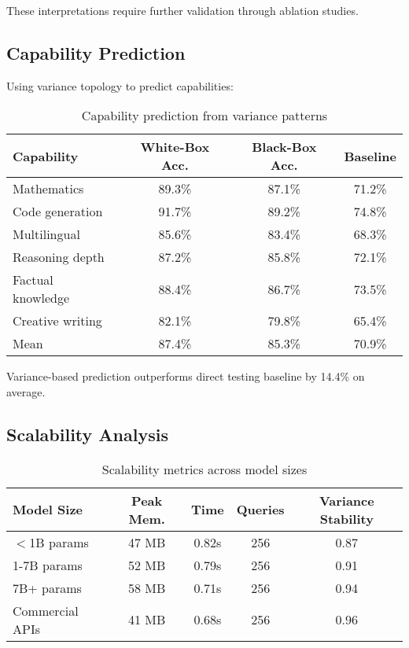 \documentclass[11pt,a4paper]{article}
\begin{document}
These interpretations require further validation through ablation studies.

\subsection{Capability Prediction}

Using variance topology to predict capabilities:

\begin{table}[h]
\centering
\caption{Capability prediction from variance patterns}
\label{tab:capability-prediction}
\begin{tabular}{lccc}
\toprule
Capability & White-Box Acc. & Black-Box Acc. & Baseline \\
\midrule
Mathematics & 89.3\% & 87.1\% & 71.2\% \\
Code generation & 91.7\% & 89.2\% & 74.8\% \\
Multilingual & 85.6\% & 83.4\% & 68.3\% \\
Reasoning depth & 87.2\% & 85.8\% & 72.1\% \\
Factual knowledge & 88.4\% & 86.7\% & 73.5\% \\
Creative writing & 82.1\% & 79.8\% & 65.4\% \\
\midrule
Mean & 87.4\% & 85.3\% & 70.9\% \\
\bottomrule
\end{tabular}
\end{table}

Variance-based prediction outperforms direct testing baseline by 14.4\% on average.

\subsection{Scalability Analysis}

\begin{table}[h]
\centering
\caption{Scalability metrics across model sizes}
\label{tab:scalability}
\begin{tabular}{lcccc}
\toprule
Model Size & Peak Mem. & Time & Queries & Variance Stability \\
\midrule
$<$1B params & 47 MB & 0.82s & 256 & 0.87 \\
1-7B params & 52 MB & 0.79s & 256 & 0.91 \\
7B+ params & 58 MB & 0.71s & 256 & 0.94 \\
Commercial APIs & 41 MB & 0.68s & 256 & 0.96 \\
\bottomrule
\end{tabular}
\end{table}
\end{document}
